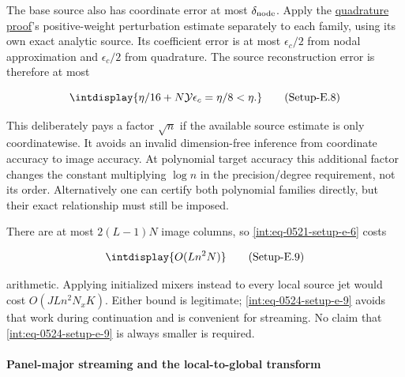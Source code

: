 
The base source also has coordinate error at most \(\delta_{\rm node}\). Apply the \hyperref[int:setup-quadrature]{quadrature proof}'s positive-weight perturbation estimate separately to each family, using its own exact analytic source. Its coefficient error is at most \(\epsilon_c/2\) from nodal approximation and \(\epsilon_c/2\) from quadrature. The source reconstruction error is therefore at most


\label{int:eq-setup-e-8}
\begingroup\renewcommand{\theHequation}{intdisplay.1009}
\begin{equation}
\intdisplay{
\eta/16+N\mathcal Y\epsilon_c=\eta/8<\eta.
}
\tag{Setup-E.8}
\label{int:eq-0523-setup-e-8}
\end{equation}
\endgroup


This deliberately pays a factor \(\sqrt n\) if the available source estimate is only coordinatewise. It avoids an invalid dimension-free inference from coordinate accuracy to image accuracy. At polynomial target accuracy this additional factor changes the constant multiplying \(\log n\) in the precision/degree requirement, not its order. Alternatively one can certify both polynomial families directly, but their exact relationship must still be imposed.



There are at most \(2(L-1)N\) image columns, so \hyperref[int:eq-setup-e-6]{\eqref{int:eq-0521-setup-e-6}} costs


\label{int:eq-setup-e-9}
\begingroup\renewcommand{\theHequation}{intdisplay.1010}
\begin{equation}
\intdisplay{
O(Ln^2N)
}
\tag{Setup-E.9}
\label{int:eq-0524-setup-e-9}
\end{equation}
\endgroup


arithmetic. Applying initialized mixers instead to every local source jet would cost \(O(JLn^2N_xK)\). Either bound is legitimate; \hyperref[int:eq-setup-e-9]{\eqref{int:eq-0524-setup-e-9}} avoids that work during continuation and is convenient for streaming. No claim that \hyperref[int:eq-setup-e-9]{\eqref{int:eq-0524-setup-e-9}} is always smaller is required.


\paragraph{Panel-major streaming and the local-to-global transform}
\label{int:setup-assembly-3}
\mbox{}\par\smallskip

